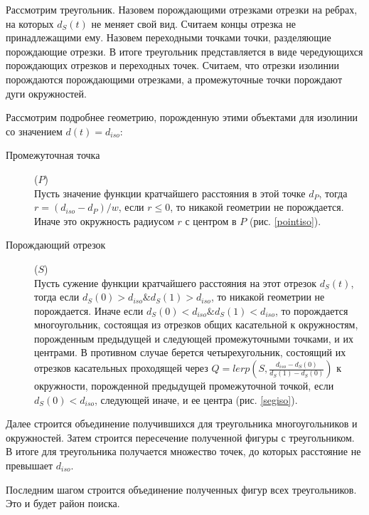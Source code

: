 Рассмотрим треугольник. Назовем порождающими отрезками отрезки на ребрах,
на которых $d_S(t)$ не меняет свой вид. Считаем концы отрезка не
принадлежащими ему. Назовем переходными точками точки,
разделяющие порождающие отрезки. В итоге треугольник представляется в виде
чередующихся порождающих отрезков и переходных точек. Считаем,
что отрезки изолинии порождаются порождающими отрезками, а
промежуточные точки порождают дуги окружностей.

Рассмотрим подробнее геометрию, порожденную этими объектами для
изолинии со значением $d(t) = d_{iso}$:
\begin{description}
\item[Промежуточная точка] ($P$) \\
Пусть значение функции кратчайшего расстояния в этой точке $d_P$, тогда
$r = (d_{iso} - d_P)/w$, если $r \leq 0$, то никакой геометрии не порождается.
Иначе это окружность радиусом $r$ с центром в $P$ (рис. \ref{pointiso}).
\item[Порождающий отрезок] ($S$) \\
Пусть сужение функции кратчайшего расстояния на этот отрезок $d_S(t)$, тогда
если $d_S(0) > d_{iso} \& d_S(1) > d_{iso}$, то никакой геометрии не порождается.
Иначе если $d_S(0) < d_{iso} \& d_S(1) < d_{iso}$, то порождается многоугольник,
состоящая из отрезков общих касательной к окружностям, порожденным предыдущей
и следующей промежуточными точками, и их центрами.
В противном случае берется четырехугольник, состоящий их отрезков касательных
проходящей через $Q = lerp(S, \frac{d_{iso}-d_S(0)}{d_S(1) - d_S(0)})$ к
окружности, порожденной предыдущей промежуточной точкой,
если $d_S(0) < d_{iso}$, следующей иначе, и ее центра (рис. \ref{segiso}).
\end{description}


Далее строится объединение получившихся для треугольника
многоугольников и окружностей. Затем строится пересечение полученной фигуры
с треугольником. В итоге для треугольника получается множество точек,
до которых расстояние не превышает $d_{iso}$.

Последним шагом строится объединение полученных фигур всех треугольников.
Это и будет район поиска.
